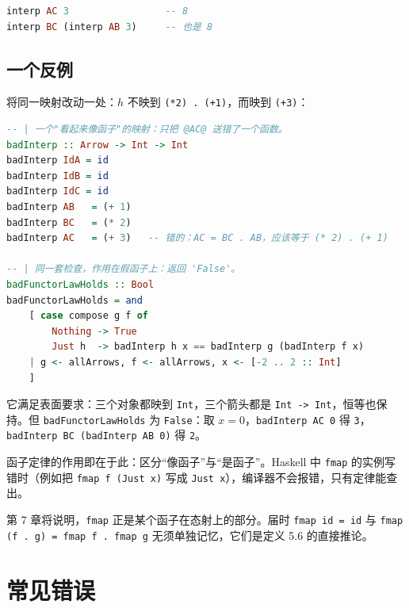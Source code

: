 \begin{lstlisting}[language=Haskell]
interp AC 3                 -- 8
interp BC (interp AB 3)     -- 也是 8
\end{lstlisting}

\subsection{一个反例}\label{ux4e00ux4e2aux53cdux4f8b}

将同一映射改动一处：\(h\) 不映到 \passthrough{\lstinline!(*2) . (+1)!}，而映到 \passthrough{\lstinline!(+3)!}：

\begin{lstlisting}[language=Haskell]
-- | 一个"看起来像函子"的映射：只把 @AC@ 送错了一个函数。
badInterp :: Arrow -> Int -> Int
badInterp IdA = id
badInterp IdB = id
badInterp IdC = id
badInterp AB   = (+ 1)
badInterp BC   = (* 2)
badInterp AC   = (+ 3)   -- 错的：AC = BC . AB，应该等于 (* 2) . (+ 1)

-- | 同一套检查，作用在假函子上：返回 'False'。
badFunctorLawHolds :: Bool
badFunctorLawHolds = and
    [ case compose g f of
        Nothing -> True
        Just h  -> badInterp h x == badInterp g (badInterp f x)
    | g <- allArrows, f <- allArrows, x <- [-2 .. 2 :: Int]
    ]
\end{lstlisting}

它满足表面要求：三个对象都映到 \passthrough{\lstinline!Int!}，三个箭头都是 \passthrough{\lstinline!Int -> Int!}，恒等也保持。但
\passthrough{\lstinline!badFunctorLawHolds!} 为 \passthrough{\lstinline!False!}：取 \(x = 0\)，\passthrough{\lstinline!badInterp AC 0!} 得 \passthrough{\lstinline!3!}，
\passthrough{\lstinline!badInterp BC (badInterp AB 0)!} 得 \passthrough{\lstinline!2!}。

函子定律的作用即在于此：区分“像函子”与“是函子”。Haskell 中 \passthrough{\lstinline!fmap!} 的实例写错时（例如把
\passthrough{\lstinline!fmap f (Just x)!} 写成 \passthrough{\lstinline!Just x!}），编译器不会报错，只有定律能查出。

第 7 章将说明，\passthrough{\lstinline!fmap!} 正是某个函子在态射上的部分。届时 \passthrough{\lstinline!fmap id = id!} 与
\passthrough{\lstinline!fmap (f . g) = fmap f . fmap g!} 无须单独记忆，它们是定义 5.6 的直接推论。

\section{常见错误}\label{ux5e38ux89c1ux9519ux8bef}

